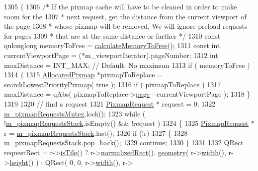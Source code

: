 \begin{DoxyCode}
1305 \{
1306     \textcolor{comment}{/* If the pixmap cache will have to be cleaned in order to make room for the}
1307 \textcolor{comment}{     * next request, get the distance from the current viewport of the page}
1308 \textcolor{comment}{     * whose pixmap will be removed. We will ignore preload requests for pages}
1309 \textcolor{comment}{     * that are at the same distance or farther */}
1310     \textcolor{keyword}{const} qulonglong memoryToFree = \hyperlink{classOkular_1_1DocumentPrivate_a91e5e2e26f829b1a08ab01c17fdecc2e}{calculateMemoryToFree}();
1311     \textcolor{keyword}{const} \textcolor{keywordtype}{int} currentViewportPage = (*m\_viewportIterator).pageNumber;
1312     \textcolor{keywordtype}{int} maxDistance = INT\_MAX; \textcolor{comment}{// Default: No maximum}
1313     \textcolor{keywordflow}{if} ( memoryToFree )
1314     \{
1315         \hyperlink{structAllocatedPixmap}{AllocatedPixmap} *pixmapToReplace = 
      \hyperlink{classOkular_1_1DocumentPrivate_a751cdd88fe8ba456a89f6c998a9ae35a}{searchLowestPriorityPixmap}( \textcolor{keyword}{true} );
1316         \textcolor{keywordflow}{if} ( pixmapToReplace )
1317             maxDistance = qAbs( pixmapToReplace->\hyperlink{structAllocatedPixmap_a197c0639216aa0819deb72fd8705d115}{page} - currentViewportPage );
1318     \}
1319 
1320     \textcolor{comment}{// find a request}
1321     \hyperlink{classOkular_1_1PixmapRequest}{PixmapRequest} * request = 0;
1322     \hyperlink{classOkular_1_1DocumentPrivate_a5c0e919d575a7a3c19a42c64a672fce4}{m\_pixmapRequestsMutex}.lock();
1323     \textcolor{keywordflow}{while} ( !\hyperlink{classOkular_1_1DocumentPrivate_af903e531960617af53b4bc79b3a95efa}{m\_pixmapRequestsStack}.isEmpty() && !request )
1324     \{
1325         \hyperlink{classOkular_1_1PixmapRequest}{PixmapRequest} * r = \hyperlink{classOkular_1_1DocumentPrivate_af903e531960617af53b4bc79b3a95efa}{m\_pixmapRequestsStack}.last();
1326         \textcolor{keywordflow}{if} (!r)
1327         \{
1328             \hyperlink{classOkular_1_1DocumentPrivate_af903e531960617af53b4bc79b3a95efa}{m\_pixmapRequestsStack}.pop\_back();
1329             \textcolor{keywordflow}{continue};
1330         \}
1331 
1332         QRect requestRect = r->\hyperlink{classOkular_1_1PixmapRequest_a7e50105623628d53dc9d82c45d7863bd}{isTile}() ? r->\hyperlink{classOkular_1_1PixmapRequest_ab867bc095f18ece11fb14ac0201a227d}{normalizedRect}().
      \hyperlink{classOkular_1_1NormalizedRect_a006897c5fcff2c3a97b4141f1a967513}{geometry}( r->\hyperlink{classOkular_1_1PixmapRequest_a3e82f09b91a52efed7435eeb9903e5fc}{width}(), r->\hyperlink{classOkular_1_1PixmapRequest_a782392a2efc6303994c7e0158c76ee06}{height}() ) : QRect( 0, 0, r->\hyperlink{classOkular_1_1PixmapRequest_a3e82f09b91a52efed7435eeb9903e5fc}{width}(), r->

\end{DoxyCode}
